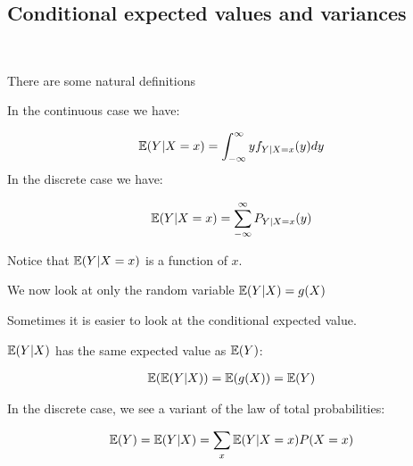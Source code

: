 \subsection{Conditional expected values and variances}\hfill\\\par
\noindent There are some natural definitions
\par\bigskip
\begin{theo}{}
  In the continuous case we have:\par
  \begin{equation*}
    \begin{gathered}
      \mathbb{E}(Y|X=x) = \int_{-\infty}^{\infty}yf_{Y|X=x}(y)dy
    \end{gathered}
  \end{equation*}
  \noindent In the discrete case we have:\par
  \begin{equation*}
    \begin{gathered}
      \mathbb{E}(Y|X=x) = \sum_{-\infty}^{\infty}P_{Y|X=x}(y)
    \end{gathered}
  \end{equation*}
\end{theo}
\par\bigskip
\noindent Notice that $\mathbb{E}(Y|X=x)$ is a function of $x$.\par
\noindent We now look at only the random variable $\mathbb{E}(Y|X) = g(X)$ 
\par\bigskip
\noindent Sometimes it is easier to look at the conditional expected value.
\par\bigskip
\begin{theo}[]{}
  $\mathbb{E}(Y|X)$ has the same expected value as $\mathbb{E}(Y)$:\par
  \begin{equation*}
    \begin{gathered}
      \mathbb{E}(\mathbb{E}(Y|X)) = \mathbb{E}(g(X)) = \mathbb{E}(Y)
    \end{gathered}
  \end{equation*}
  \par\bigskip
  \noindent In the discrete case, we see a variant of the law of total probabilities:\par
  \begin{equation*}
    \begin{gathered}
      \mathbb{E}(Y) = \mathbb{E}(Y|X) = \sum_x \mathbb{E}(Y|X=x)P(X=x)
    \end{gathered}
  \end{equation*}
\end{theo}
